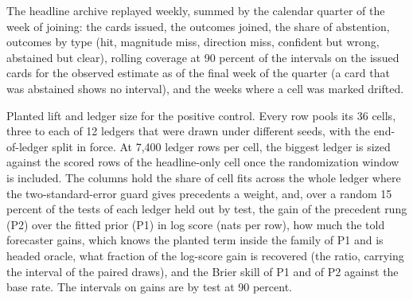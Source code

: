 \begin{table}[t]\centering\scriptsize
\caption{The headline archive replayed weekly, summed by the calendar quarter of the week of joining: the cards issued, the outcomes joined, the share of abstention, outcomes by type (hit, magnitude miss, direction miss, confident but wrong, abstained but clear), rolling coverage at 90 percent of the intervals on the issued cards for the observed estimate as of the final week of the quarter (a card that was abstained shows no interval), and the weeks where a cell was marked drifted.}
\label{tab:replay}
\resizebox{\textwidth}{!}{}
\end{table}

\begin{table}[t]\centering\scriptsize
\caption{Planted lift and ledger size for the positive control. Every row pools its 36 cells, three to each of 12 ledgers that were drawn under different seeds, with the end-of-ledger split in force. At 7,400 ledger rows per cell, the biggest ledger is sized against the scored rows of the headline-only cell once the randomization window is included. The columns hold the share of cell fits across the whole ledger where the two-standard-error guard gives precedents a weight, and, over a random 15 percent of the tests of each ledger held out by test, the gain of the precedent rung (P2) over the fitted prior (P1) in log score (nats per row), how much the told forecaster gains, which knows the planted term inside the family of P1 and is headed oracle, what fraction of the log-score gain is recovered (the ratio, carrying the interval of the paired draws), and the Brier skill of P1 and of P2 against the base rate. The intervals on gains are by test at 90 percent.}
\label{tab:positive-control-gain}
\resizebox{\textwidth}{!}{}
\end{table}

